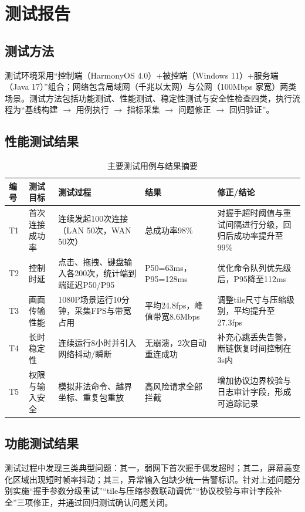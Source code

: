 \documentclass[UTF8,fontset=none]{ctexart}
\begin{document}
\newpage
\section{测试报告}

\subsection{测试方法}
测试环境采用“控制端（HarmonyOS 4.0）+被控端（Windows 11）+服务端（Java 17）”组合；网络包含局域网（千兆以太网）与公网（100Mbps 家宽）两类场景。测试方法包括功能测试、性能测试、稳定性测试与安全性检查四类，执行流程为“基线构建 $\rightarrow$ 用例执行 $\rightarrow$ 指标采集 $\rightarrow$ 问题修正 $\rightarrow$ 回归验证”。

\subsection{性能测试结果}
\begin{table}[H]
\centering
\caption{主要测试用例与结果摘要}
\small
\setlength{\tabcolsep}{4pt}
\renewcommand{\arraystretch}{1.2}
\begin{tabular}{L{1.2cm}L{3.1cm}L{3.4cm}L{2.9cm}L{3.1cm}}
\toprule
编号 & 测试目标 & 测试过程 & 结果 & 修正/结论 \\
\midrule
T1 & 首次连接成功率 & 连续发起100次连接（LAN 50次，WAN 50次） & 总成功率98\% & 对握手超时阈值与重试间隔进行分级，回归后成功率提升至99\% \\
T2 & 控制时延 & 点击、拖拽、键盘输入各200次，统计端到端延迟P50/P95 & P50=63ms，P95=128ms & 优化命令队列优先级后，P95降至112ms \\
T3 & 画面传输性能 & 1080P场景运行10分钟，采集FPS与带宽占用 & 平均24.8fps，峰值带宽8.6Mbps & 调整tile尺寸与压缩级别，平均提升至27.3fps \\
T4 & 长时稳定性 & 连续运行8小时并引入网络抖动/瞬断 & 无崩溃，2次自动重连成功 & 补充心跳丢失告警，断链恢复时间控制在3s内 \\
T5 & 权限与输入安全 & 模拟非法命令、越界坐标、重复包重放 & 高风险请求全部拦截 & 增加协议边界校验与日志审计字段，形成可追踪记录 \\
\bottomrule
\end{tabular}
\end{table}

\subsection{功能测试结果}
测试过程中发现三类典型问题：其一，弱网下首次握手偶发超时；其二，屏幕高变化区域出现短时帧率抖动；其三，异常输入包缺少统一告警标识。针对上述问题分别实施“握手参数分级重试”“tile与压缩参数联动调优”“协议校验与审计字段补全”三项修正，并通过回归测试确认问题关闭。
\end{document}

